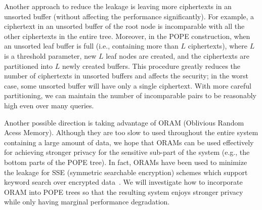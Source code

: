 

Another approach to reduce the leakage is leaving more ciphertexts in an
unsorted buffer (without affecting the performance significantly). For example,
a ciphertext in an unsorted buffer of the root node is incomparable with all
the other ciphertexts in the entire tree.  Moreover, in the POPE construction,
when an unsorted leaf buffer is full (i.e.,  containing more than $L$
ciphertexts), where $L$ is a threshold parameter, new $L$ leaf nodes are
created, and the ciphertexts are partitioned into $L$ newly created buffers.
This procedure greatly reduces the number of ciphertexts in unsorted buffers
and affects the security; in the worst case, some unsorted buffer will have
only a single ciphertext. With more careful partitioning, we can maintain the
number of incomparable pairs to be reasonably high even over many queries. 


Another possible direction is taking advantage of ORAM (Oblivious Random Acess
Memory). Although they are too slow to used throughout the entire system
containing a large amount of data, we hope that ORAMs can be used effectively
for achieving stronger privacy for the sensitive sub-part of the system (e.g.,
the bottom parts of the POPE tree).  In fact, ORAMs have been used to minimize
the leakage for SSE (symmetric searchable encryption) schemes which support
keyword search over encrypted
data~\cite{NDSS:StePapShi14,C:GarMohPap16,RSA:IKLO16}. We will investigate how
to incorporate ORAM into POPE trees so that the resulting system enjoys
stronger privacy while only having marginal performance degradation.  



